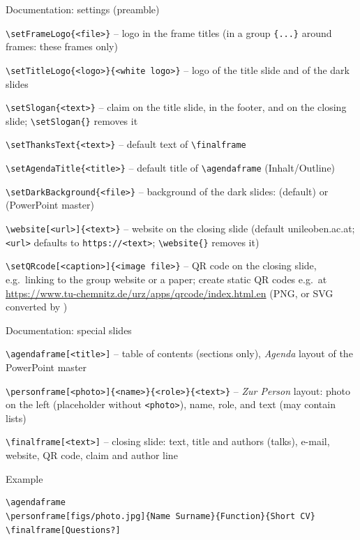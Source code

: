 \begin{frame}[fragile]{Documentation: settings (preamble)}
	\scriptsize
	\begin{doclist}
		\item \verb|\setFrameLogo{<file>}| -- logo in the frame titles (in a group \verb|{...}| around frames: these frames only)
		\item \verb|\setTitleLogo{<logo>}{<white logo>}| -- logo of the title slide and of the dark slides
		\item \verb|\setSlogan{<text>}| -- claim on the title slide, in the footer, and on the closing slide; \verb|\setSlogan{}| removes it
		\item \verb|\setThanksText{<text>}| -- default text of \verb|\finalframe|
		\item \verb|\setAgendaTitle{<title>}| -- default title of \verb|\agendaframe| (Inhalt/Outline)
		\item \verb|\setDarkBackground{<file>}| -- background of the dark slides:  (default) or  (PowerPoint master)
		\item \verb|\website[<url>]{<text>}| -- website on the closing slide (default unileoben.ac.at; \verb|<url>| defaults to \verb|https://<text>|; \verb|\website{}| removes it)
		\item \verb|\setQRcode[<caption>]{<image file>}| -- QR code on the closing slide, e.g.\ linking to the group website or a paper; create static QR codes e.g.\ at \url{https://www.tu-chemnitz.de/urz/apps/qrcode/index.html.en} (PNG, or SVG converted by )
	\end{doclist}
\end{frame}
%
\begin{frame}[fragile]{Documentation: special slides}
	\scriptsize
	\begin{doclist}
		\item \verb|\agendaframe[<title>]| -- table of contents (sections only), \emph{Agenda} layout of the PowerPoint master
		\item \verb|\personframe[<photo>]{<name>}{<role>}{<text>}| -- \emph{Zur Person} layout: photo on the left (placeholder without \verb|<photo>|), name, role, and text (may contain lists)
		\item \verb|\finalframe[<text>]| -- closing slide: text, title and authors (talks), e-mail, website, QR code, claim and author line
	\end{doclist}
	\medskip
	\begin{exampleblock}{Example}
\begin{verbatim}
\agendaframe
\personframe[figs/photo.jpg]{Name Surname}{Function}{Short CV}
\finalframe[Questions?]
\end{verbatim}
	\end{exampleblock}
\end{frame}
